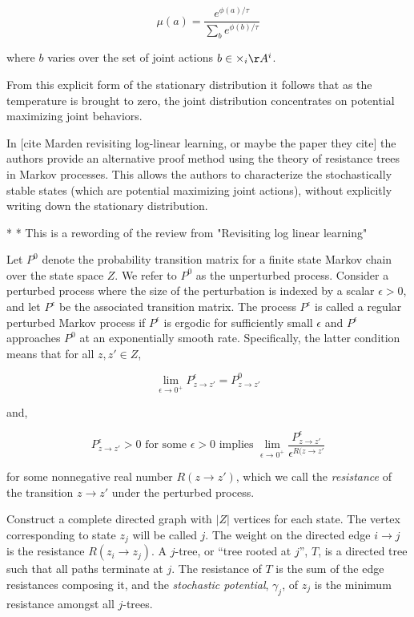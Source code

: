 $$
\mu(a) = \dfrac{e^{\phi(a)/\tau}}{\sum_{b} e^{\phi(b)/\tau}}
$$

where $b$ varies over the set of joint actions $b \in \times_i \AA^i$.

From this explicit form of the stationary distribution it follows that as the temperature is brought to zero, the joint distribution concentrates on potential maximizing joint behaviors.


In [cite Marden revisiting log-linear learning, or maybe the paper they cite] the authors provide an alternative proof method using the theory of resistance trees in Markov processes. This allows the authors to characterize the stochastically stable states (which are potential maximizing joint actions), without explicitly writing down the stationary distribution.

*
*
This is a rewording of the review from "Revisiting log linear learning"

Let $P^0$ denote the probability transition matrix for a finite state Markov chain over the state space $Z$. We refer to $P^0$ as the unperturbed process. Consider a perturbed process where the size of the perturbation is indexed by a scalar $\epsilon > 0$, and let $P^{\epsilon}$ be the associated transition matrix. The process $P^{\epsilon}$ is called a regular perturbed Markov process if $P^{\epsilon}$ is ergodic for sufficiently small $\epsilon$ and $P^{\epsilon}$ approaches $P^0$ at an exponentially smooth rate. Specifically, the latter condition means that for all $z, z' \in Z$,

$$
\lim_{\epsilon \rightarrow 0^+} P^{\epsilon}_{z \rightarrow z'} = P^0_{z \rightarrow z'}
$$

and,

$$
P^{\epsilon}_{z \rightarrow z'} > 0 \mbox{ for some } \epsilon > 0 \mbox{ implies } \lim_{\epsilon \rightarrow 0^+} \dfrac{P^{\epsilon}_{z \rightarrow z'}}{\epsilon^{R(z \rightarrow z'}}
$$

for some nonnegative real number $R(z \rightarrow z')$, which we call the {\em resistance} of the transition $z \rightarrow z'$ under the perturbed process. 

Construct a complete directed graph with $|Z|$ vertices for each state. The vertex corresponding to state $z_j$ will be called $j$. The weight on the directed edge $i \rightarrow j$ is the resistance $R(z_i \rightarrow z_j)$. A $j$-tree, or ``tree rooted at $j$'', $T$, is a directed tree such that all paths terminate at $j$. The resistance of $T$ is the sum of the edge resistances composing it, and the {\em stochastic potential}, $\gamma_j$, of $z_j$ is the minimum resistance amongst all $j$-trees.

